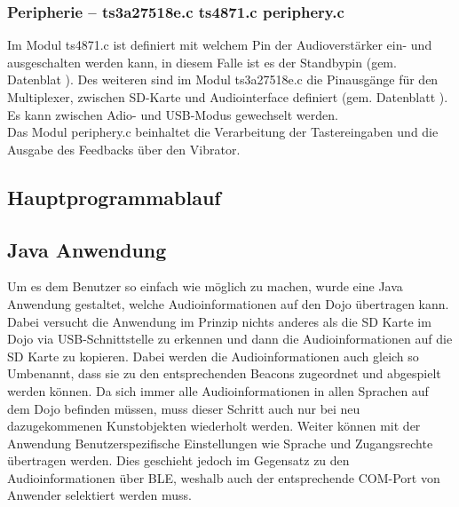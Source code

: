 \subsubsection{Peripherie -- ts3a27518e.c ts4871.c periphery.c }

Im Modul ts4871.c ist definiert mit welchem Pin der Audioverstärker ein- und ausgeschalten werden kann, in diesem Falle ist es der Standbypin (gem. Datenblat \cite{TS4871}). Des weiteren sind im Modul ts3a27518e.c die Pinausgänge für den Multiplexer, zwischen SD-Karte und Audiointerface definiert (gem. Datenblatt \cite{TS3A27518E}). Es kann zwischen Adio- und USB-Modus gewechselt werden.\\
Das Modul periphery.c beinhaltet die Verarbeitung der Tastereingaben und die Ausgabe des Feedbacks über den Vibrator.

\subsection{Hauptprogrammablauf}


\subsection{Java Anwendung}

Um es dem Benutzer so einfach wie möglich zu machen, wurde eine Java Anwendung gestaltet, welche Audioinformationen auf den Dojo übertragen kann. Dabei versucht die Anwendung im Prinzip nichts anderes als die SD Karte im Dojo via USB-Schnittstelle zu erkennen und dann die Audioinformationen auf die SD Karte zu kopieren. Dabei werden die Audioinformationen auch gleich so Umbenannt, dass sie zu den entsprechenden Beacons zugeordnet und abgespielt werden können. Da sich immer alle Audioinformationen in allen Sprachen auf dem Dojo befinden müssen, muss dieser Schritt auch nur bei neu dazugekommenen Kunstobjekten wiederholt werden. Weiter können mit der Anwendung Benutzerspezifische Einstellungen wie Sprache und Zugangsrechte übertragen werden. Dies geschieht jedoch im Gegensatz zu den Audioinformationen über BLE, weshalb auch der entsprechende COM-Port von Anwender selektiert werden muss.

